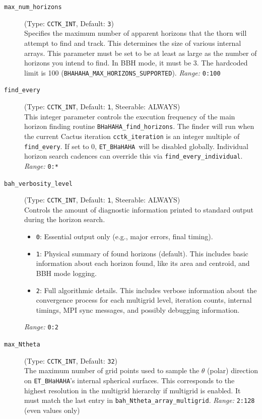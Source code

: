 \documentclass[a4paper,11pt]{article}
\newcommand{\thorn}[1]{{\tt #1}}
\newcommand{\BHaHAHA}{\thorn{ET\_BHaHAHA}} %
\begin{document}
\begin{description}
    \item[\texttt{max\_num\_horizons}] (Type: \texttt{CCTK\_INT}, Default: \texttt{3}) \\
        Specifies the maximum number of apparent horizons that the thorn will attempt to find and track. This determines the size of various internal arrays. This parameter must be set to be at least as large as the number of horizons you intend to find. In BBH mode, it must be 3. The hardcoded limit is 100 (\texttt{BHAHAHA\_MAX\_HORIZONS\_SUPPORTED}).
        \textit{Range:} \texttt{0:100}

    \item[\texttt{find\_every}] (Type: \texttt{CCTK\_INT}, Default: \texttt{1}, Steerable: ALWAYS) \\
        This integer parameter controls the execution frequency of the main horizon finding routine \texttt{BHaHAHA\_find\_horizons}. The finder will run when the current Cactus iteration \texttt{cctk\_iteration} is an integer multiple of \texttt{find\_every}. If set to 0, \BHaHAHA\ will be disabled globally. Individual horizon search cadences can override this via \texttt{find\_every\_individual}.
        \textit{Range:} \texttt{0:*}

    \item[\texttt{bah\_verbosity\_level}] (Type: \texttt{CCTK\_INT}, Default: \texttt{1}, Steerable: ALWAYS) \\
        Controls the amount of diagnostic information printed to standard output during the horizon search.
        \begin{itemize}
            \item \texttt{0}: Essential output only (e.g., major errors, final timing).
            \item \texttt{1}: Physical summary of found horizons (default). This includes basic information about each horizon found, like its area and centroid, and BBH mode logging.
            \item \texttt{2}: Full algorithmic details. This includes verbose information about the convergence process for each multigrid level, iteration counts, internal timings, MPI sync messages, and possibly debugging information.
        \end{itemize}
        \textit{Range:} \texttt{0:2}

    \item[\texttt{max\_Ntheta}] (Type: \texttt{CCTK\_INT}, Default: \texttt{32}) \\
        The maximum number of grid points used to sample the $\theta$ (polar) direction on \BHaHAHA's internal spherical surfaces. This corresponds to the highest resolution in the multigrid hierarchy if multigrid is enabled. It must match the last entry in \texttt{bah\_Ntheta\_array\_multigrid}.
        \textit{Range:} \texttt{2:128} (even values only)


\end{description}
\end{document}
